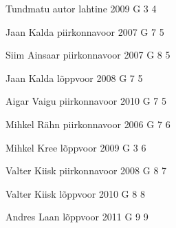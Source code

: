 \documentclass[11pt]{article}
\begin{document}
{Tundmatu autor} %
{lahtine} %
{2009} %
{G 3} %
{4} %
{

\ifEngHint
\fi
}

{Jaan Kalda} %
{piirkonnavoor} %
{2007} %
{G 7} %
{5} %
{

\ifEngHint
\fi
}

{Siim Ainsaar} %
{piirkonnavoor} %
{2007} %
{G 8} %
{5} %
{

\ifEngHint
\fi
}

{Jaan Kalda} %
{lõppvoor} %
{2008} %
{G 7} %
{5} %
{

\ifEngHint
\fi
}

{Aigar Vaigu} %
{piirkonnavoor} %
{2010} %
{G 7} %
{5} %
{

\ifEngHint
\fi
}

{Mihkel Rähn} %
{piirkonnavoor} %
{2006} %
{G 7} %
{6} %
{

\ifEngHint
\fi
}

{Mihkel Kree} %
{lõppvoor} %
{2009} %
{G 3} %
{6} %
{

\ifEngHint
\fi
}

{Valter Kiisk} %
{piirkonnavoor} %
{2008} %
{G 8} %
{7} %
{

\ifEngHint
\fi
}

{Valter Kiisk} %
{lõppvoor} %
{2010} %
{G 8} %
{8} %
{

\ifEngHint
\fi
}

{Andres Laan} %
{lõppvoor} %
{2011} %
{G 9} %
{9} %
{

\ifEngHint
\fi
}
\end{document}
